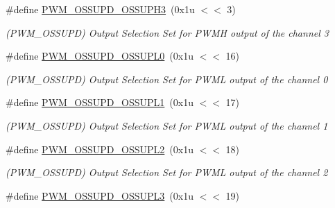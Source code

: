 \begin{DoxyCompactItemize}
\mbox{\label{group__SAMS70__PWM_ga205af3b8a9ec5ffab21ef4cb55df79bf}} 
\#define \mbox{\hyperlink{group__SAMS70__PWM_ga205af3b8a9ec5ffab21ef4cb55df79bf}{P\+W\+M\+\_\+\+O\+S\+S\+U\+P\+D\+\_\+\+O\+S\+S\+U\+P\+H3}}~(0x1u $<$$<$ 3)
\begin{DoxyCompactList}\small\item\em (P\+W\+M\+\_\+\+O\+S\+S\+U\+PD) Output Selection Set for P\+W\+MH output of the channel 3 \end{DoxyCompactList}\item 
\mbox{\label{group__SAMS70__PWM_gac35e76bcb2b7795022e5117eec690bfc}} 
\#define \mbox{\hyperlink{group__SAMS70__PWM_gac35e76bcb2b7795022e5117eec690bfc}{P\+W\+M\+\_\+\+O\+S\+S\+U\+P\+D\+\_\+\+O\+S\+S\+U\+P\+L0}}~(0x1u $<$$<$ 16)
\begin{DoxyCompactList}\small\item\em (P\+W\+M\+\_\+\+O\+S\+S\+U\+PD) Output Selection Set for P\+W\+ML output of the channel 0 \end{DoxyCompactList}\item 
\mbox{\label{group__SAMS70__PWM_ga3326e4bb5f84da296e7ac992ac029553}} 
\#define \mbox{\hyperlink{group__SAMS70__PWM_ga3326e4bb5f84da296e7ac992ac029553}{P\+W\+M\+\_\+\+O\+S\+S\+U\+P\+D\+\_\+\+O\+S\+S\+U\+P\+L1}}~(0x1u $<$$<$ 17)
\begin{DoxyCompactList}\small\item\em (P\+W\+M\+\_\+\+O\+S\+S\+U\+PD) Output Selection Set for P\+W\+ML output of the channel 1 \end{DoxyCompactList}\item 
\mbox{\label{group__SAMS70__PWM_ga3e9d15e834de3bb5db7f1549d86f1a57}} 
\#define \mbox{\hyperlink{group__SAMS70__PWM_ga3e9d15e834de3bb5db7f1549d86f1a57}{P\+W\+M\+\_\+\+O\+S\+S\+U\+P\+D\+\_\+\+O\+S\+S\+U\+P\+L2}}~(0x1u $<$$<$ 18)
\begin{DoxyCompactList}\small\item\em (P\+W\+M\+\_\+\+O\+S\+S\+U\+PD) Output Selection Set for P\+W\+ML output of the channel 2 \end{DoxyCompactList}\item 
\mbox{\label{group__SAMS70__PWM_ga2e53b31cb8b3a9ce73db36088eb131f1}} 
\#define \mbox{\hyperlink{group__SAMS70__PWM_ga2e53b31cb8b3a9ce73db36088eb131f1}{P\+W\+M\+\_\+\+O\+S\+S\+U\+P\+D\+\_\+\+O\+S\+S\+U\+P\+L3}}~(0x1u $<$$<$ 19)
$$
\end{DoxyCompactItemize}
